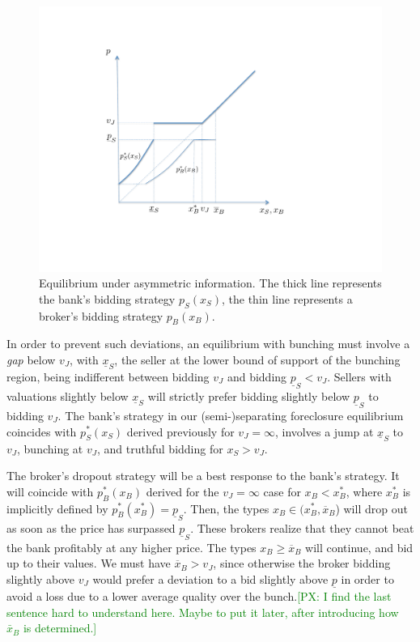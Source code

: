 \documentclass[11pt,twopage]{article}
\newcommand{\PX}[1]{\textcolor{green}{[PX: #1]}}
\newcommand{\ol}{\overline}
\newcommand{\ul}{\underline}
\begin{document}
  

\begin{figure}[tf]
  \centering
  \includegraphics[scale = 0.6]{graphics/eqm_common.pdf}
  \caption{Equilibrium under asymmetric information. The thick line
  represents the bank's bidding strategy $p_S(x_S)$, the thin line
  represents a broker's bidding strategy $p_B(x_B)$.}
 \label{fig:eqm_common}
\end{figure}

In order to prevent such deviations, an equilibrium with bunching must
involve a \emph{gap} below $v_J$, with $\underline x_S$, the seller at
the lower bound of support of the bunching region, being indifferent
between bidding $v_J$ and bidding $\ul p_S<v_J$. Sellers with
valuations slightly below $\ul x_S$ will strictly prefer bidding
slightly below $\ul p_S$ to bidding $v_J$.  The bank's strategy in our
(semi-)separating foreclosure equilibrium coincides with $p_S^*(x_S)$
derived previously for $v_J=\infty$, involves a jump at $\ul x_S$ to
$v_J$, bunching at $v_J$, and truthful bidding for $x_S > v_J$.

The broker's dropout strategy will be a best response to the bank's
strategy. It will coincide with $p_B^*(x_B)$ derived for the
$v_J=\infty$ case for $x_B < x_B^*$, where $x_B^*$ is implicitly
defined by $p_B^*(x_B^*)=\ul p_S$. Then, the types $x_B \in (x_B^*,\ol
x_B$) will drop out as soon as the price has surpassed $\ul
p_S$. These brokers realize that they cannot beat the bank profitably
at any higher price. The types $x_B \geq \ol x_B$ will continue, and bid up
to their values. We must have $\ol x_B > v_J$, since otherwise the
broker bidding slightly above $v_J$ would prefer a deviation to a bid
slightly above $\ul p$ in order to avoid a loss due to a lower average
quality over the bunch.\PX{I find the last sentence hard to understand here. Maybe to put it later, after introducing how $\bar{x}_B$ is determined.}
\end{document}
